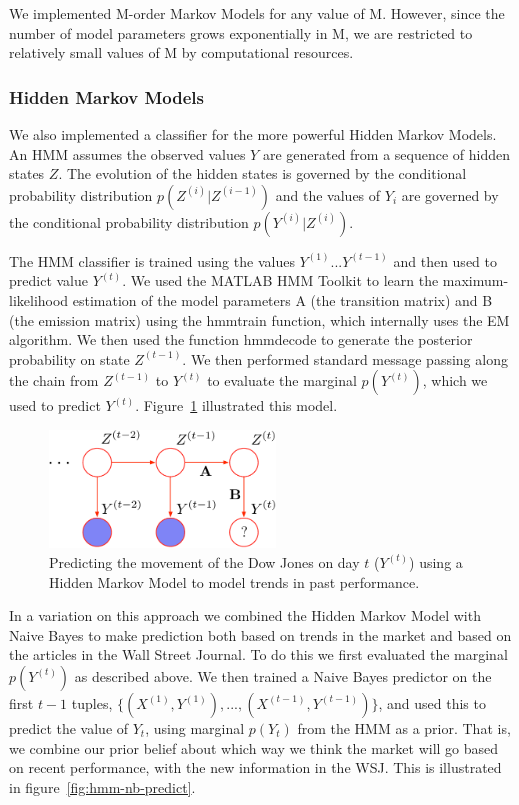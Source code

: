 \documentclass[10pt, twocolumn]{article}
\def\TODO#1{\noindent\textbf{[TODO:} #1]}
\begin{document}
We implemented M-order Markov Models for any value of M. However, since the number of model parameters grows exponentially in M, we are restricted to relatively small values of M by computational resources.

\subsubsection{Hidden Markov Models}
\label{sec:hmm}

We also implemented a classifier for the more powerful Hidden Markov Models. An HMM assumes the observed values $Y$ are generated from a sequence of hidden states $Z$.
The evolution of the hidden states is governed by the conditional probability distribution $p(Z^{(i)}|Z^{(i-1)})$ and the values of $Y_{i}$ are governed by the conditional probability distribution $p(Y^{(i)}|Z^{(i)})$.

The HMM classifier is trained using the values $Y^{(1)}...Y^{(t-1)}$ and then used to predict value $Y^{(t)}$.
We used the MATLAB HMM Toolkit to learn the maximum-likelihood estimation of the model parameters A (the transition matrix) and B (the emission matrix) using the hmmtrain function, which internally uses the EM algorithm.
We then used the function hmmdecode to generate the posterior probability on state $Z^{(t-1)}$.
We then performed standard message passing along the chain from $Z^{(t-1)}$ to $Y^{(t)}$ to evaluate the marginal $p(Y^{(t)})$, which we used to predict $Y^{(t)}$.
Figure~\ref{fig:hmm-predict} illustrated this model.

\begin{figure}
\center
\includegraphics[width=6cm]{figs/hmm-predict.pdf}
\caption{Predicting the movement of the Dow Jones on day $t$ ($Y^{(t)}$) using a Hidden Markov Model to model trends in past performance.}
\label{fig:hmm-predict}
\end{figure}

In a variation on this approach we combined the Hidden Markov Model with Naive Bayes to make prediction both based on trends in the market and based on the articles in the Wall Street Journal.
To do this we first evaluated the marginal $p(Y^{(t)})$ as described above.
We then trained a Naive Bayes predictor on the first $t-1$ tuples, $\{(X^{(1)},Y^{(1)}), ..., (X^{(t-1)},Y^{(t-1)})\}$, and used this to predict the value of $Y_{t}$, using marginal $p(Y_{t})$ from the HMM as a prior.
That is, we combine our prior belief about which way we think the market will go based on recent performance, with the new information in the WSJ.
This is illustrated in figure~\ref{fig:hmm-nb-predict}. 
\end{document}
